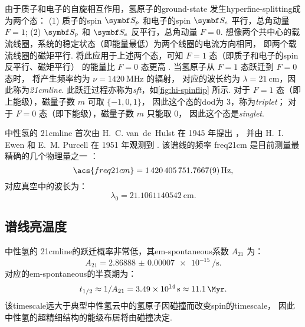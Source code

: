 由于质子和电子的自旋相互作用，氢原子的\ac{ground-state}
发生\ac{hyperfine-splitting}成为两个态：
(1) 质子的\ac{spin} $\B{S}_p$ 和电子的\ac{spin} $\B{S}_e$ 平行，总角动量 $F = 1$;
(2) $\B{S}_p$ 和 $\B{S}_e$ 反平行，总角动量 $F = 0$.
想像两个共中心的载流线圈，系统的稳定状态（即能量最低）为两个线圈的电流方向相同，
即两个载流线圈的磁矩平行.
将此应用于上述两个态，可知 $F = 1$ 态（即质子和电子的\ac{spin}反平行、磁矩平行）
的能量比 $F = 0$ 态更高 \cite{griffiths1982}.
当氢原子从 $F = 1$ 态跃迁到 $F = 0$ 态时，
将产生频率约为 $\nu = \SI{1420}{\MHz}$ 的辐射，
对应的波长约为 $\lambda = \SI{21}{\cm}$，因此称为\emph{\acf{21cmline}}.
此跃迁过程亦称为\emph{\acf{sft}}，如\autoref{fig:hi-spinflip} 所示.
对于 $F = 1$ 态（即上能级），磁量子数 $m$ 可取 $\{ -1, 0, 1 \}$，
因此这个态的\ac{dod}为 3，称为\emph{\acf{triplet}}；
对于 $F = 0$ 态（即下能级），磁量子数 $m$ 只能取 0，
因此这个态是\emph{\acf{singlet}}.

中性氢的 \ac{21cmline}%
首次由 H.~C. van~de~Hulst 在 1945 年提出 \cite{vanDeHulst1945}，
并由 H.~I. Ewen 和 E.~M. Purcell 在 1951 年观测到 \cite{ewen1951}.
该谱线的频率 \ac{freq21cm} 是目前测量最精确的几个物理量之一
\cite{hellwig1970,essen1971}：
\begin{equation}
  \label{eq:hi-line-frequency}
  \acs{freq21cm} = \SI{1420405751.7667 +- 0.0009}{\Hz} ,
\end{equation}
对应真空中的波长为：
\begin{equation}
  \label{eq:hi-line-wavelength}
  \lambda_0 = \SI{21.1061140542}{\cm} .
\end{equation}

\subsection{谱线亮温度}

中性氢的 \ac{21cmline}的跃迁概率非常低，其\ac{em-spontaneous}系数 $A_{21}$ 为：
\begin{equation}
  A_{21} = \SI[separate-uncertainty=false]{2.86888(7)e-15}{\per\second} .
\end{equation}
对应的\ac{em-spontaneous}的半衰期为：
\begin{equation}
  t_{1/2} \approx 1 / A_{21}
    = \SI{3.49e14}{\second} \approx \SI{11.1}{\Myr} .
\end{equation}
该\ac{timescale}远大于典型中性氢云中的氢原子因碰撞而改变\ac{spin}的\ac{timescale}，
因此中性氢的超精细结构的能级布居将由碰撞决定.

